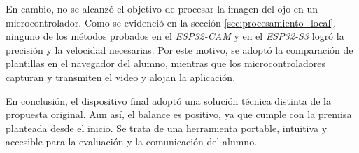 En cambio, no se alcanzó el objetivo de procesar la imagen del ojo en un microcontrolador. Como se evidenció en la sección \ref{sec:procesamiento_local}, ninguno de los métodos probados en el \emph{ESP32-CAM} y en el \emph{ESP32-S3} logró la precisión y la velocidad necesarias. Por este motivo, se adoptó la comparación de plantillas en el navegador del alumno, mientras que los microcontroladores capturan y transmiten el video y alojan la aplicación.

En conclusión, el dispositivo final adoptó una solución técnica distinta de la propuesta original. Aun así, el balance es positivo, ya que cumple con la premisa planteada desde el inicio. Se trata de una herramienta portable, intuitiva y accesible para la evaluación y la comunicación del alumno.








